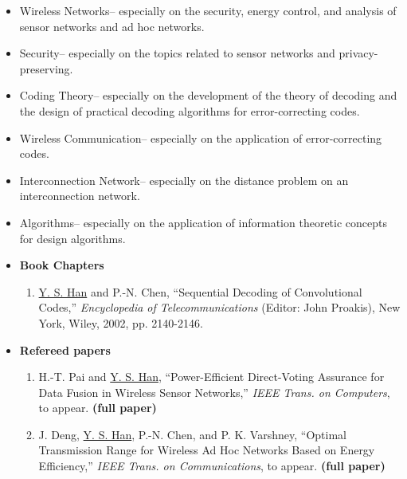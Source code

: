 \begin{llist}
\bigskip

\begin{itemize}
\item{Wireless Networks-- especially on the security, energy
control, and analysis of sensor networks and ad hoc networks.}

\item{Security-- especially on the topics related to sensor
networks and privacy-preserving.}

\item{Coding Theory-- especially on the development of the theory
of decoding and the design of practical decoding algorithms for
error-correcting codes.}

\item{Wireless Communication-- especially on the application of
error-correcting codes.}

\item{Interconnection Network-- especially on the distance problem
on an interconnection network.} \item{Algorithms-- especially on
the application of information theoretic concepts for design
algorithms.}


\end{itemize}



\begin{itemize}
\item {\bf\large Book Chapters}
\begin{enumerate}
\item \underline{Y. S. Han} and P.-N. Chen, ``Sequential Decoding of  Convolutional Codes,''
 {\it Encyclopedia of Telecommunications} (Editor: John Proakis), New York, Wiley,
 2002, pp. 2140-2146.
\end{enumerate}
\item {\bf\large Refereed papers}
\begin{enumerate}

\item H.-T. Pai and \underline{Y. S. Han}, ``Power-Efficient Direct-Voting Assurance for Data Fusion
in Wireless Sensor Networks,'' {\it IEEE Trans. on Computers}, to appear. {\bf
(full paper)}

\item J. Deng, \underline{Y. S. Han}, P.-N. Chen, and P. K. Varshney, ``Optimal Transmission Range for
Wireless Ad Hoc Networks Based on Energy Efficiency,'' {\it IEEE Trans. on
Communications}, to appear. {\bf (full paper)}



\end{enumerate}
\end{itemize}
\end{llist}
